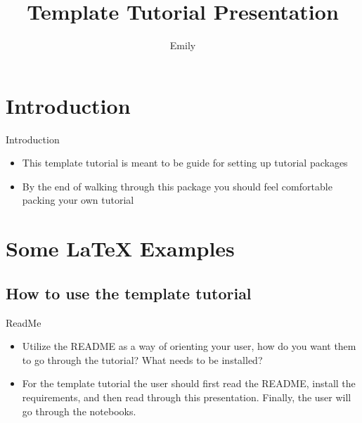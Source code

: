 \documentclass{beamer}
\title[Template Tutorial Presentation]{Template Tutorial Presentation}
\author{Emily}
\begin{document}
\begin{frame}
  \titlepage
\end{frame}


\section{Introduction}

\begin{frame}{Introduction}

\begin{itemize}
  \item This template tutorial is meant to be guide for setting up tutorial packages 
  \item By the end of walking through this package you should feel comfortable packing your own tutorial  
\end{itemize}


\end{frame}

\section{Some \LaTeX{} Examples}

\subsection{How to use the template tutorial}

\begin{frame}{ReadMe}

\begin{itemize}
  \pause \item Utilize the README as a way of orienting your user, how do you want them to go through the tutorial? What needs to be installed?
  \pause \item For the template tutorial the user should first read the README, install the requirements, and then read through this presentation. Finally, the user will go through the notebooks.
\end{itemize}

\end{frame}
\end{document}
